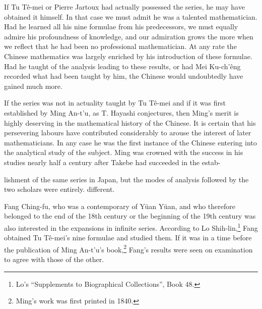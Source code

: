 \documentclass[11pt]{article}
\newcommand{\scanpage}[2]{\clearpage\setcounter{footnote}{0}\noindent{\footnotesize\color{gray}PDF page #1 · #2}\par\medskip}
\newcommand{\scanfooter}{}
\begin{document}
If Tu Tê-mei or Pierre Jartoux had actually possessed the series, he may have obtained it himself. In that case we must admit he was a talented mathematician. Had he learned all his nine formulae from his predecessors, we must equally admire his profoundness of knowledge, and our admiration grows the more when we reflect that he had been no professional mathematician. At any rate the Chinese mathematics was largely enriched by his introduction of these formulae. Had he taught of the analysis leading to these results, or had Mei Ku-ch'êng recorded what had been taught by him, the Chinese would undoubtedly have gained much more.

If the series was not in actuality taught by Tu Tê-mei and if it was first established by Ming An-t'u, as T. Hayashi conjectures, then Ming's merit is highly deserving in the mathematical history of the Chinese. It is certain that his persevering labours have contributed considerably to arouse the interest of later mathematicians. In any case he was the first instance of the Chinese entering into the analytical study of the subject. Ming was crowned with the success in his studies nearly half a century after Takebe had succeeded in the estab-
\scanfooter

\scanpage{0164}{Chapter 21, printed page 150}
lishment of the same series in Japan, but the modes of analysis followed by the two scholars were entirely. different.

Fang Ching-fu, who was a contemporary of Yüan Yüan, and who therefore belonged to the end of the 18th century or the beginning of the 19th century was also interested in the expansions in infinite series. According to Lo Shih-lin,\footnote{Lo's ``Supplements to Biographical Collections'', Book 48.} Fang obtained Tu Tê-mei's nine formulae and studied them. If it was in a time before the publication of Ming An-t'u's book,\footnote{Ming's work was first printed in 1840.} Fang's results were seen on examination to agree with those of the other.
\end{document}
